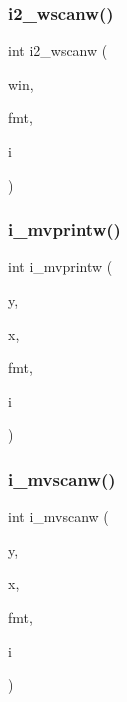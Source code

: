 \subsubsection{\texorpdfstring{i2\+\_\+wscanw()}{i2\_wscanw()}}
{\footnotesize\ttfamily int i2\+\_\+wscanw (\begin{DoxyParamCaption}\item[{W\+I\+N\+D\+OW $\ast$}]{win,  }\item[{char $\ast$}]{fmt,  }\item[{short $\ast$}]{i }\end{DoxyParamCaption})}

\mbox{\label{C-macros_8c_aeb5fc07bdb9b6670a11c4d74fd32ccf8}} 
\subsubsection{\texorpdfstring{i\+\_\+mvprintw()}{i\_mvprintw()}}
{\footnotesize\ttfamily int i\+\_\+mvprintw (\begin{DoxyParamCaption}\item[{int}]{y,  }\item[{int}]{x,  }\item[{const char $\ast$}]{fmt,  }\item[{int}]{i }\end{DoxyParamCaption})}

\mbox{\label{C-macros_8c_a31b17f5fa08e8b64e9b314300f548c33}} 
\subsubsection{\texorpdfstring{i\+\_\+mvscanw()}{i\_mvscanw()}}
{\footnotesize\ttfamily int i\+\_\+mvscanw (\begin{DoxyParamCaption}\item[{int}]{y,  }\item[{int}]{x,  }\item[{char $\ast$}]{fmt,  }\item[{int $\ast$}]{i }\end{DoxyParamCaption})}

\mbox{\label{C-macros_8c_a67cef3b1074a38caaa2f8db9b2f953b5}} 
